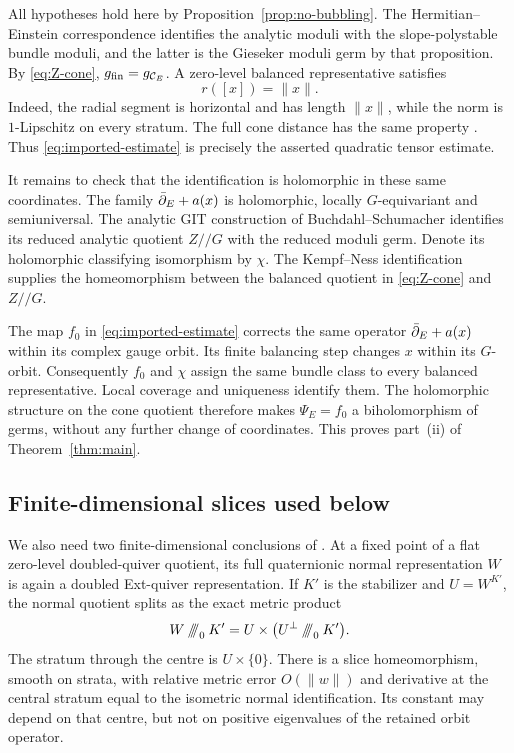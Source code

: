 All hypotheses hold here by Proposition~\ref{prop:no-bubbling}.
The Hermitian--Einstein correspondence identifies the analytic
moduli with the slope-polystable bundle moduli, and the latter
is the Gieseker moduli germ by that proposition. By
\eqref{eq:Z-cone}, $g_{\rm fin}=g_{\mathcal C_E}$. A zero-level
balanced representative satisfies
\begin{equation}\label{eq:cone-radius}
 r([x])=\|x\|.
\end{equation}
Indeed, the radial segment is horizontal and has length
$\|x\|$, while the norm is $1$-Lipschitz on every stratum.
The full cone distance has the same property
\cite[Section~5]{wuebben14}. Thus \eqref{eq:imported-estimate}
is precisely the asserted quadratic tensor estimate.

It remains to check that the identification is holomorphic in
these same coordinates. The family $\bar\partial_E+a(x)$ is
holomorphic, locally $G$-equivariant and semiuniversal. The
analytic GIT construction of Buchdahl--Schumacher
\cite[Theorems~5--9 and Remark~4]{buchdahl21} identifies its
reduced analytic quotient $Z/\!/G$ with the reduced moduli
germ. Denote its holomorphic classifying isomorphism by $\chi$.
The Kempf--Ness identification supplies the homeomorphism
between the balanced quotient in \eqref{eq:Z-cone} and
$Z/\!/G$.

The map $f_0$ in \eqref{eq:imported-estimate} corrects the
same operator $\bar\partial_E+a(x)$ within its complex gauge orbit.
Its finite balancing step changes $x$ within its $G$-orbit.
Consequently $f_0$ and $\chi$ assign the same bundle class to
every balanced representative. Local coverage and uniqueness
identify them. The holomorphic structure on the cone quotient
therefore makes $\Psi_E=f_0$ a biholomorphism of germs, without
any further change of coordinates. This proves part~(ii) of
Theorem~\ref{thm:main}.

\subsection{Finite-dimensional slices used below}\label{subsec:slice-input}
We also need two finite-dimensional conclusions of
\cite[Sections~4--6]{wuebben14}. At a fixed point of a flat
zero-level doubled-quiver quotient, its full quaternionic
normal representation $W$ is again a doubled Ext-quiver
representation. If $K'$ is the stabilizer and $U=W^{K'}$,
the normal quotient splits as the exact metric product
\begin{equation}\label{eq:normal-product}
 W\hkr_0K'=U\times\bigl(U^\perp\hkr_0K'\bigr).
\end{equation}
The stratum through the centre is $U\times\{0\}$. There is a
slice homeomorphism, smooth on strata, with relative metric
error $O(\|w\|)$ and derivative at the central stratum equal
to the isometric normal identification. Its constant may
depend on that centre, but not on positive eigenvalues of the
retained orbit operator.

